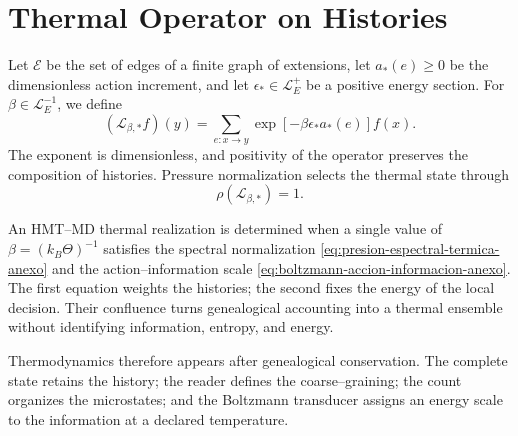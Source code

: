 \section{Thermal Operator on Histories}

Let \(\mathcal E\) be the set of edges of a finite graph of extensions, let
\(a_*(e)\geq0\) be the dimensionless action increment, and let
\(\epsilon_*\in\mathcal L_E^+\) be a positive energy section. For \(\beta\in\mathcal L_E^{-1}\), we define
\begin{equation}
 (\mathcal L_{\beta,*}f)(y)
 =\sum_{e:x\to y}
 \exp[-\beta\epsilon_*a_*(e)]f(x).
 \label{eq:operador-transferencia-termica-anexo}
\end{equation}
The exponent is dimensionless, and positivity of the operator preserves the
composition of histories. Pressure normalization selects the thermal
state through
\begin{equation}
 \boxed{\rho(\mathcal L_{\beta,*})=1.}
 \label{eq:presion-espectral-termica-anexo}
\end{equation}

\begin{proposition}
\label{prop:confluencia-termica-anexo}
An HMT--MD thermal realization is determined when a single value of
\(\beta=(k_B\Theta)^{-1}\) satisfies the spectral normalization
\eqref{eq:presion-espectral-termica-anexo} and the action--information scale
\eqref{eq:boltzmann-accion-informacion-anexo}. The first equation weights the
histories; the second fixes the energy of the local decision. Their confluence
turns genealogical accounting into a thermal ensemble without identifying
information, entropy, and energy.
\end{proposition}

Thermodynamics therefore appears after genealogical conservation.
The complete state retains the history; the reader defines the coarse--graining;
the count organizes the microstates; and the Boltzmann transducer assigns an
energy scale to the information at a declared temperature.
